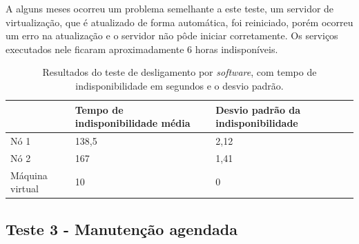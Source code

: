 A alguns meses ocorreu um problema semelhante a este teste, um servidor de virtualização, que é atualizado de forma 
automática, foi reiniciado, porém ocorreu um erro na atualização e o servidor não pôde iniciar corretamente. Os serviços executados nele ficaram 
aproximadamente 6 horas indisponíveis.


\begin{table}[h!]
\caption{Resultados do teste de desligamento por \textit{software}, com tempo de indisponibilidade em segundos e o desvio padrão.}
\label{tab:teste2resultados}
\begin{center}
\begin{tabular}{|l|l|l|}\hline
 & \textbf{Tempo de indisponibilidade média} & \textbf{Desvio padrão da indisponibilidade} \\\hline
Nó 1 & 138,5 & 2,12 \\\hline
Nó 2 & 167 & 1,41 \\\hline
Máquina virtual & 10 & 0 \\\hline
\end{tabular}
\end{center}
\end{table}


\subsection{Teste 3 - Manutenção agendada}

